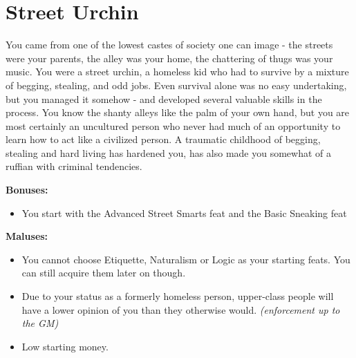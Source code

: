 \section{Street Urchin}
You came from one of the lowest castes of society one can image - the streets were your parents, the alley was your home, the chattering of thugs was your music. You were a street urchin, a homeless kid who had to survive by a mixture of begging, stealing, and odd jobs. Even survival alone was no easy undertaking, but you managed it somehow - and developed several valuable skills in the process. You know the shanty alleys like the palm of your own hand, but you are most certainly an uncultured person who never had much of an opportunity to learn how to act like a civilized person. A traumatic childhood of begging, stealing and hard living has hardened you, has also made you somewhat of a ruffian with criminal tendencies.


\textbf{Bonuses:}
\begin{itemize}
	\item You start with the Advanced Street Smarts feat and the Basic Sneaking feat
\end{itemize}
\textbf{Maluses:}
\begin{itemize}
	\item You cannot choose Etiquette, Naturalism or Logic as your starting feats. You can still acquire them later on though.
	\item Due to your status as a formerly homeless person, upper-class people will have a lower opinion of you than they otherwise would. \textit{(enforcement up to the GM)}
	\item Low starting money.
\end{itemize}
